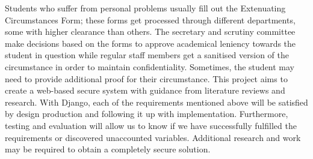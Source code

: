 \documentclass[../main.tex]{subfiles}
\begin{document}
\raggedright
Students who suffer from personal problems usually fill out the Extenuating Circumstances Form; these forms get processed through different departments, some with higher clearance than others. The secretary and scrutiny committee make decisions based on the forms to approve academical leniency towards the student in question while regular staff members get a sanitised version of the circumstance in order to maintain confidentiality. Sometimes, the student may need to provide additional proof for their circumstance. This project aims to create a web-based secure system with guidance from literature reviews and research. With Django, each of the requirements mentioned above will be satisfied by design production and following it up with implementation. Furthermore, testing and evaluation will allow us to know if we have successfully fulfilled the requirements or discovered unaccounted variables. Additional research and work may be required to obtain a completely secure solution. 
\end{document}
